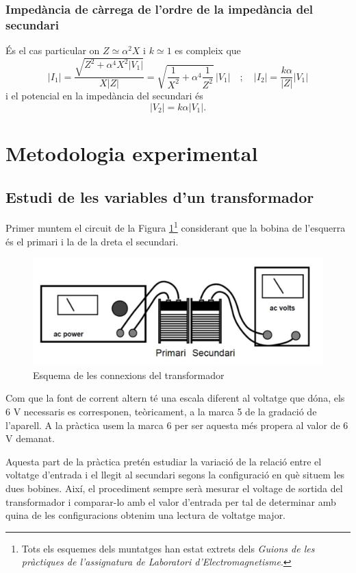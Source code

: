 \documentclass[a4paper,10.5pt]{report}
\begin{document}
\subsubsection{Impedància de càrrega de l'ordre de la impedància del secundari}
És el cas particular on $Z \simeq \alpha^2X$ i $k \simeq 1$ es compleix que
\begin{equation}
	|I_1| = \frac{\sqrt{Z^2 + \alpha^4 X^2 |V_1|}}{X |Z|} = \sqrt{ \frac{1}{X^2} + \alpha^4 \frac{1}{Z^2} } \, |V_1| 
	\quad ; \quad |I_2| = \frac{k \alpha}{|Z|} |V_1|
	\label{eq4:23}
\end{equation}
i el potencial en la impedància del secundari és
\begin{equation}
	|V_2| = k \alpha |V_1|.
	\label{eq4:24}
\end{equation}

\section{Metodologia experimental}
\subsection{Estudi de les variables d'un transformador}
Primer muntem el circuit de la Figura \ref{fig4:1}\footnote{Tots els esquemes dels muntatges han estat extrets dels \textit{Guions de les pràctiques de l'assignatura de Laboratori d'Electromagnetisme}\cite{ref3}.} considerant que la bobina de l'esquerra és el primari i la de la dreta el secundari.

\begin{figure}[h]
	\centering
	\includegraphics[width=0.38\linewidth]{screenshot007}
	\caption{Esquema de les connexions del transformador}
	\label{fig4:1}
\end{figure}

Com que la font de corrent altern té una escala diferent al voltatge que dóna, els 6 V necessaris es corresponen, teòricament, a la marca 5 de la gradació de l'aparell. A la pràctica usem la marca 6 per ser aquesta més propera al valor de 6 V demanat.

Aquesta part de la pràctica pretén estudiar la variació de la relació entre el voltatge d'entrada i el llegit al secundari segons la configuració en què situem les dues bobines. Així, el procediment sempre serà mesurar el voltage de sortida del transformador i comparar-lo amb el valor d'entrada per tal de determinar amb quina de les configuracions obtenim una lectura de voltatge major.
\end{document}

